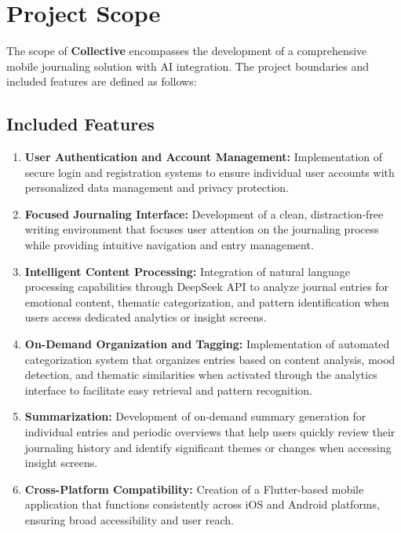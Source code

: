 \section{Project Scope}\label{sec:scope}

The scope of \textbf{Collective} encompasses the development of a comprehensive mobile journaling solution with AI integration. The project boundaries and included features are defined as follows:

\subsection{Included Features}\label{subsec:included-features}

\begin{enumerate}
	\item \textbf{User Authentication and Account Management:} Implementation of secure login and registration systems to ensure individual user accounts with personalized data management and privacy protection.
	
	\item \textbf{Focused Journaling Interface:} Development of a clean, distraction-free writing environment that focuses user attention on the journaling process while providing intuitive navigation and entry management.
	
	\item \textbf{Intelligent Content Processing:} Integration of natural language processing capabilities through DeepSeek API to analyze journal entries for emotional content, thematic categorization, and pattern identification when users access dedicated analytics or insight screens.
	
	\item \textbf{On-Demand Organization and Tagging:} Implementation of automated categorization system that organizes entries based on content analysis, mood detection, and thematic similarities when activated through the analytics interface to facilitate easy retrieval and pattern recognition.
	
	\item \textbf{Summarization:} Development of on-demand summary generation for individual entries and periodic overviews that help users quickly review their journaling history and identify significant themes or changes when accessing insight screens.
	
	\item \textbf{Cross-Platform Compatibility:} Creation of a Flutter-based mobile application that functions consistently across iOS and Android platforms, ensuring broad accessibility and user reach.
	

\end{enumerate}
